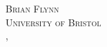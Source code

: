 \begin{titlepage}
    
    \vspace{0.2cm}
    \textsc{\Large Brian Flynn}\\[1.5cm]
    
    \vspace{2.2cm}
    \textsc{\Large University of Bristol}\\[1.5cm]
    
    
    {\large \monthname, \the\year}\\[1cm] %
    
    
    
    \end{titlepage}